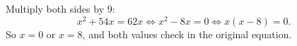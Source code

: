Multiply both sides by $9$:
\[x^2+54x=62x\iff x^2-8x=0\iff x(x-8)=0 .\]
So $x=\boxed{0}$ or $x=\boxed{8}$, and both values check in the original equation.
